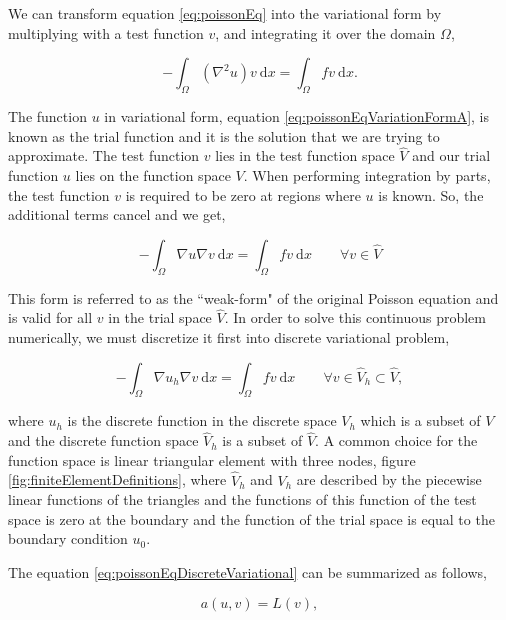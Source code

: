 We can transform equation \ref{eq:poissonEq} into the variational form by multiplying with a test function $v$, and integrating it over the domain $\Omega$,


	\begin{equation}
	- \int_{\Omega} \left(\nabla^2 u\right)v\ \mathrm{d}x= \int_{\Omega} fv\ \mathrm{d}x.
	\label{eq:poissonEqVariationFormA}
	\end{equation}

The function $u$ in variational form, equation \ref{eq:poissonEqVariationFormA}, is known as the trial function and it is the solution that we are trying to approximate. The test function $v$ lies in the test function space $\hat{V}$ and our trial function $u$ lies on the function space $V$. When performing integration by parts, the test function $v$ is required to be zero at regions where $u$ is known. So, the additional terms cancel and we get,

	\begin{equation}
	- \int_{\Omega} \nabla u \nabla v\ \mathrm{d}x= \int_{\Omega} fv\ \mathrm{d}x \qquad \forall v \in \hat{V}
	\label{eq:poissonEqVariationFormB}
	\end{equation}

This form is referred to as the ``weak-form" of the original Poisson equation and is valid for all $v$ in the trial space $\hat{V}$. In order to solve this continuous problem numerically, we must discretize it first into discrete variational problem,

	\begin{equation}
	- \int_{\Omega} \nabla u_h \nabla v\ \mathrm{d}x= \int_{\Omega} fv\ \mathrm{d}x \qquad \forall v \in \hat{V}_h \subset \hat{V},
	\label{eq:poissonEqDiscreteVariational}
	\end{equation}

where $u_h$ is the discrete function in the discrete space $V_h$ which is a subset of $V$ and the discrete function space $\hat{V}_h$ is a subset of $\hat{V}$. A common choice for the function space is linear triangular element with three nodes, figure \ref{fig:finiteElementDefinitions}, where $\hat{V}_h$ and $V_h$ are described by the piecewise linear functions of the triangles and the functions of this function of the test space is zero at the boundary and the function of the trial space is equal to the boundary condition $u_0$.

The equation \ref{eq:poissonEqDiscreteVariational} can be summarized as follows,

	\begin{equation}
	a\left(u,v\right) = L(v),
	\label{eq:weakForm}
	\end{equation}

